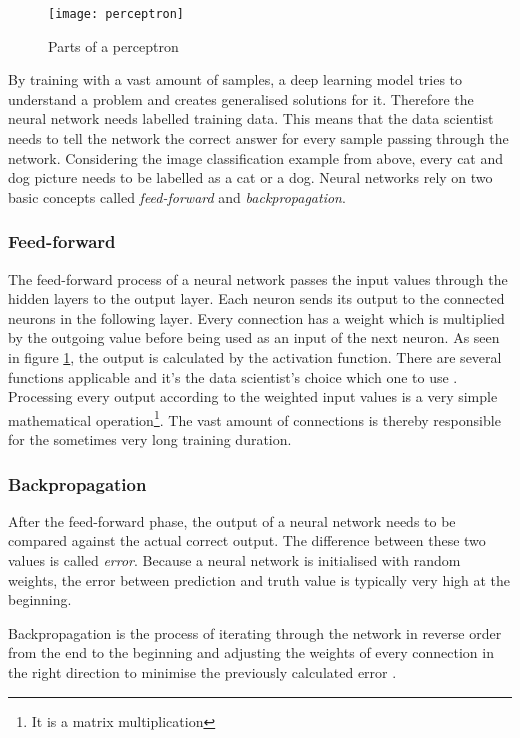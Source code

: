 \begin{figure}[!ht]
    \centering
    \texttt{[image: perceptron]}
    \caption{Parts of a perceptron}
    \label{fig:perceptron}
\end{figure}

By training with a vast amount of samples, a deep learning model tries to understand a problem and creates generalised solutions for it. Therefore the neural network needs labelled training data. This means that the data scientist needs to tell the network the correct answer for every sample passing through the network. Considering the image classification example from above, every cat and dog picture needs to be labelled as a cat or a dog. Neural networks rely on two basic concepts called \emph{feed-forward} and \emph{backpropagation}.

\subsubsection{Feed-forward}

The feed-forward process of a neural network passes the input values through the hidden layers to the output layer. Each neuron sends its output to the connected neurons in the following layer. Every connection has a weight which is multiplied by the outgoing value before being used as an input of the next neuron. As seen in figure \ref{fig:perceptron}, the output is calculated by the activation function. There are several functions applicable and it's the data scientist's choice which one to use \cite{nn}. Processing every output according to the weighted input values is a very simple mathematical operation\footnote{It is a matrix multiplication}. The vast amount of connections is thereby responsible for the sometimes very long training duration.

\subsubsection{Backpropagation}

After the feed-forward phase, the output of a neural network needs to be compared against the actual correct output. The difference between these two values is called \emph{error}. Because a neural network is initialised with random weights, the error between prediction and truth value is typically very high at the beginning.

Backpropagation is the process of iterating through the network in reverse order from the end to the beginning and adjusting the weights of every connection in the right direction to minimise the previously calculated error \cite{nn}.

